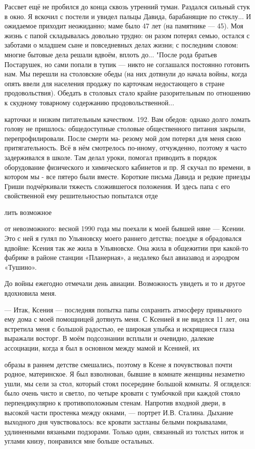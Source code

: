 \label{191-1}
Рассвет ещё не пробился до конца сквозь утренний туман. Раздался сильный стук в окно. Я вскочил с постели и увидел пальцы Давида, барабанящие по стеклу... И ожидаемое приходит неожиданно; маме было 47 лет (на памятнике — 45). Моя жизнь с папой складывалась довольно трудно: он разом потерял семью, остался с заботами о младшем сыне и повседневных делах жизни; с последним словом: многие бытовые дела решали вдвоём, вплоть до... "После рода братьев Постарушек, но сами попали в тупик — никто не соглашался постоянно готовить нам. Мы перешли на столовские обеды (на них дотянули до начала войны, когда опять ввели для населения продажу по карточкам недостающего в стране продовольствия). Обедать в столовых стало крайне разорительным по отношению к скудному товарному содержанию продовольственной...

\label{192-1}
карточки и низким питательным качеством. 192. Вам обедов: однако долго ломать голову не пришлось: общедоступные столовые общественного питания закрыли, перепрофилировали. После смерти ма- резому мой дом потерял для меня свою притягательность. Всё в нём смотрелось по-иному, отчужденно, поэтому я часто задерживался в школе. Там делал уроки, помогал приводить в порядок оборудование физического и химического кабинетов и пр. Я скучал по времени, в котором мы - все пятеро были вместе. Короткие письма Давида и редкие приезды Гриши подчёркивали тяжесть сложившегося положения. И здесь папа с его свойственной ему решительностью попытался отде

\label{193-1}
лить возможное

от невозможного: весной 1990 года мы поехали к моей бывшей няне — Ксении. Это с ней я гулял по Ульяновску моего раннего детства; поездке я обрадовался вдвойне: Ксения так же жила в Ульяновске. Она жила в общежитии при какой-то фабрике в районе станции «Планерная», а недалеко был авиазавод и аэродром «Тушино».

До войны ежегодно отмечали день авиации. Возможность увидеть и то и другое вдохновила меня.

— Итак, Ксения — последняя попытка папы сохранить атмосферу привычного ему дома с моей помощницей дотянуть меня. С Ксенией я не виделся 11 лет, она встретила меня с большой радостью, ее широкая улыбка и искрящиеся глаза выражали восторг. В моём подсознании всплыли и очевидно, далекие ассоциации, когда я был в основном между мамой и Ксенией, их

\label{194-1}
образы в раннем детстве смешались, поэтому в Ксене я почувствовал почти родное, материнское. Я был взволнован, бывшие в комнате женщины незаметно ушли, мы сели за стол, который стоял посередине большой комнаты. Я огляделся: было очень чисто и светло, по четыре кровати с тумбочкой при каждой стояло перпендикулярно к противоположным стенам. Напротив входной двери, в высокой части простенка между окнами, — портрет И.В. Сталина. Дыхание выходного дня чувствовалось: все кровати застланы белыми покрывалами, удлиненными вязаными подзорами. Только один, связанный из толстых ниток и углами книзу, понравился мне больше остальных.

